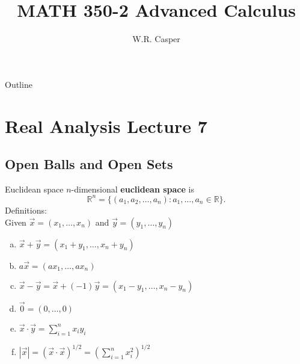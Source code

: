 \documentclass{beamer}
\title{MATH 350-2 Advanced Calculus}
\subtitle
{} %
\author[W.R. Casper] %
{W.R. Casper}
\institute[California State University Fullerton] %
{
  Department of Mathematics\\
  California State University Fullerton}
\begin{document}
\begin{frame}
  \titlepage
\end{frame}

\begin{frame}{Outline}
  \tableofcontents
\end{frame}



\section{Real Analysis Lecture 7}

\subsection{Open Balls and Open Sets}

\begin{frame}{Euclidean space}
\pause
$n$-dimensional \textbf{euclidean space} is
\pause
$$\mathbb{R}^n = \{(a_1,a_2,\dots,a_n): a_1,\dots, a_n\in\mathbb{R}\}.$$
\pause
Definitions:\\
\pause
Given $\vec x = (x_1,\dots, x_n)$ and $\vec y = (y_1,\dots, y_n)$
\begin{enumerate}[(a)]
\pause
\item $\vec x + \vec y = (x_1+y_1,\dots,x_n+y_n)$
\pause
\item $a\vec x = (ax_1,\dots, ax_n)$
\pause
\item $\vec x - \vec y = \vec x + (-1)\vec y = (x_1-y_1,\dots,x_n-y_n)$
\pause
\item $\vec 0 = (0,\dots, 0)$
\pause
\item $\vec x\cdot\vec y = \sum_{i=1}^n x_iy_i$
\pause
\item $|\vec x| = (\vec x\cdot\vec x)^{1/2} = \left(\sum_{i=1}^nx_i^2\right)^{1/2}$
\end{enumerate}
\end{frame}
\end{document}

